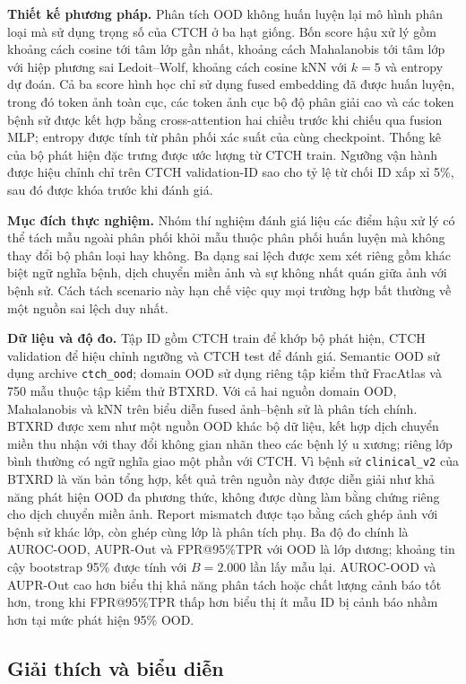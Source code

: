 \textbf{Thiết kế phương pháp.} Phân tích OOD không huấn luyện lại mô hình phân loại mà sử dụng trọng số của CTCH ở ba hạt giống. Bốn score hậu xử lý gồm khoảng cách cosine tới tâm lớp gần nhất, khoảng cách Mahalanobis tới tâm lớp với hiệp phương sai Ledoit--Wolf, khoảng cách cosine kNN với $k=5$ và entropy dự đoán. Cả ba score hình học chỉ sử dụng fused embedding đã được huấn luyện, trong đó token ảnh toàn cục, các token ảnh cục bộ độ phân giải cao và các token bệnh sử được kết hợp bằng cross-attention hai chiều trước khi chiếu qua fusion MLP; entropy được tính từ phân phối xác suất của cùng checkpoint. Thống kê của bộ phát hiện đặc trưng được ước lượng từ CTCH train. Ngưỡng vận hành được hiệu chỉnh chỉ trên CTCH validation-ID sao cho tỷ lệ từ chối ID xấp xỉ 5\%, sau đó được khóa trước khi đánh giá.

\textbf{Mục đích thực nghiệm.} Nhóm thí nghiệm đánh giá liệu các điểm hậu xử lý có thể tách mẫu ngoài phân phối khỏi mẫu thuộc phân phối huấn luyện mà không thay đổi bộ phân loại hay không. Ba dạng sai lệch được xem xét riêng gồm khác biệt ngữ nghĩa bệnh, dịch chuyển miền ảnh và sự không nhất quán giữa ảnh với bệnh sử. Cách tách scenario này hạn chế việc quy mọi trường hợp bất thường về một nguồn sai lệch duy nhất.

\textbf{Dữ liệu và độ đo.} Tập ID gồm CTCH train để khớp bộ phát hiện, CTCH
validation để hiệu chỉnh ngưỡng và CTCH test để đánh giá. Semantic OOD sử dụng
archive \texttt{ctch\_ood}; domain OOD sử dụng riêng tập kiểm thử FracAtlas và
750 mẫu thuộc tập kiểm thử BTXRD. Với cả hai nguồn domain OOD, Mahalanobis và
kNN trên biểu diễn fused ảnh--bệnh sử là phân tích chính. BTXRD được xem như một nguồn
OOD khác bộ dữ liệu, kết hợp dịch chuyển miền thu nhận với thay đổi không gian
nhãn theo các bệnh lý u xương; riêng lớp bình thường có ngữ nghĩa giao một phần
với CTCH. Vì bệnh sử \texttt{clinical\_v2} của BTXRD là văn bản tổng hợp, kết quả
trên nguồn này được diễn giải như khả năng phát hiện OOD đa phương thức, không
được dùng làm bằng chứng riêng cho dịch chuyển miền ảnh. Report mismatch được tạo bằng
cách ghép ảnh với bệnh sử khác lớp, còn ghép cùng lớp là phân tích phụ. Ba độ đo
chính là AUROC-OOD, AUPR-Out và FPR@95\%TPR với OOD là lớp dương; khoảng tin cậy
bootstrap 95\% được tính với $B=2.000$ lần lấy mẫu lại. AUROC-OOD và AUPR-Out
cao hơn biểu thị khả năng phân tách hoặc chất lượng cảnh báo tốt hơn, trong khi
FPR@95\%TPR thấp hơn biểu thị ít mẫu ID bị cảnh báo nhầm hơn tại mức phát hiện
95\% OOD.

\subsection{Giải thích và biểu diễn}
\label{subsec:explainability_representation}

